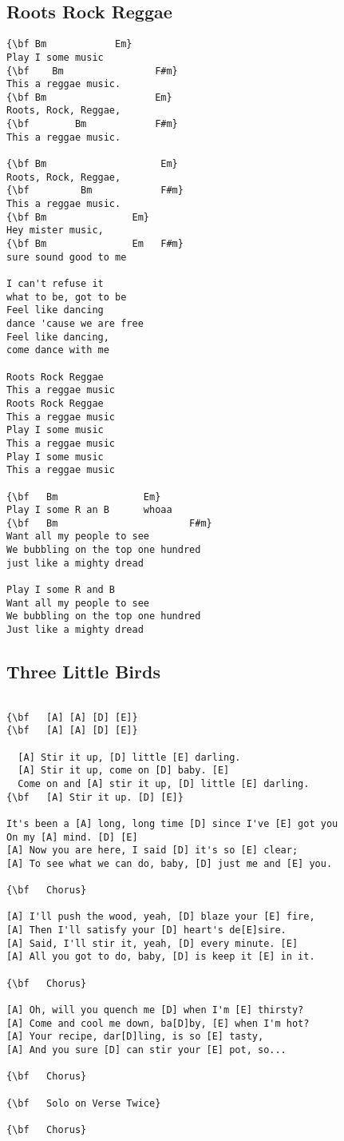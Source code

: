 \documentclass[a4paper]{article}
\begin{document}
\subsection{Roots Rock Reggae} %
\label{sub:Roots Rock Reggae}
\begin{Verbatim}[commandchars=\\\{\}]
{\bf Bm            Em}
Play I some music
{\bf    Bm                F#m}
This a reggae music.
{\bf Bm                   Em}
Roots, Rock, Reggae,
{\bf        Bm            F#m}
This a reggae music.

{\bf Bm                    Em}
Roots, Rock, Reggae,
{\bf         Bm            F#m}
This a reggae music.
{\bf Bm               Em}
Hey mister music,
{\bf Bm               Em   F#m}
sure sound good to me

I can't refuse it
what to be, got to be
Feel like dancing
dance 'cause we are free
Feel like dancing,
come dance with me

Roots Rock Reggae
This a reggae music
Roots Rock Reggae
This a reggae music
Play I some music
This a reggae music
Play I some music
This a reggae music

{\bf   Bm               Em}
Play I some R an B      whoaa
{\bf   Bm                       F#m}
Want all my people to see
We bubbling on the top one hundred
just like a mighty dread

Play I some R and B
Want all my people to see
We bubbling on the top one hundred
Just like a mighty dread
\end{Verbatim}
\newpage
\subsection{Three Little Birds} %
\label{sub:Three Little Birds}
\begin{Verbatim}[commandchars=\\\{\}]

{\bf   [A] [A] [D] [E]}
{\bf   [A] [A] [D] [E]}

  [A] Stir it up, [D] little [E] darling.
  [A] Stir it up, come on [D] baby. [E]
  Come on and [A] stir it up, [D] little [E] darling.
{\bf   [A] Stir it up. [D] [E]}

It's been a [A] long, long time [D] since I've [E] got you
On my [A] mind. [D] [E]
[A] Now you are here, I said [D] it's so [E] clear;
[A] To see what we can do, baby, [D] just me and [E] you.

{\bf   Chorus}

[A] I'll push the wood, yeah, [D] blaze your [E] fire,
[A] Then I'll satisfy your [D] heart's de[E]sire.
[A] Said, I'll stir it, yeah, [D] every minute. [E]
[A] All you got to do, baby, [D] is keep it [E] in it.

{\bf   Chorus}

[A] Oh, will you quench me [D] when I'm [E] thirsty?
[A] Come and cool me down, ba[D]by, [E] when I'm hot?
[A] Your recipe, dar[D]ling, is so [E] tasty,
[A] And you sure [D] can stir your [E] pot, so...

{\bf   Chorus}

{\bf   Solo on Verse Twice}

{\bf   Chorus}
\end{Verbatim}
\newpage
\end{document}
